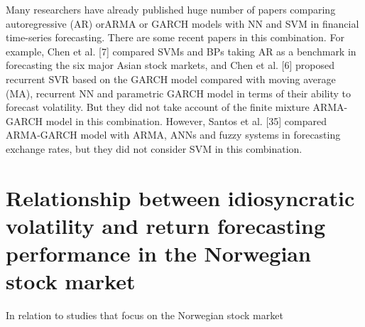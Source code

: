 Many researchers have already published huge number of papers comparing autoregressive (AR) orARMA or GARCH models with NN and SVM in financial time-series forecasting. There are some recent papers in this combination. For example, Chen et al. [7] compared SVMs and BPs taking AR as a benchmark in forecasting the six major Asian stock markets, and Chen et al. [6] proposed recurrent SVR based on the GARCH model compared with moving average (MA), recurrent NN and parametric GARCH model in terms of their ability to forecast volatility. But they did not take account of the finite mixture ARMA-GARCH model in this combination. However, Santos et al. [35] compared ARMA-GARCH model with ARMA, ANNs and fuzzy systems in forecasting exchange rates, but they did not consider SVM in this combination. 


\section*{Relationship between idiosyncratic volatility and return forecasting performance in the Norwegian stock market}

In relation to studies that focus on the Norwegian stock market